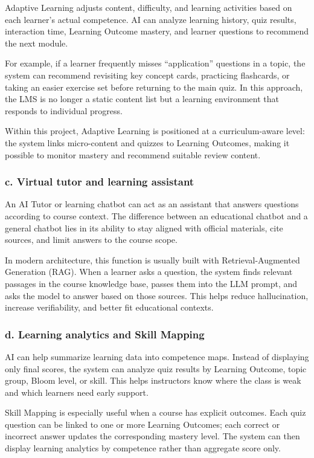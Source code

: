 Adaptive Learning adjusts content, difficulty, and learning activities based on
each learner's actual competence. AI can analyze learning history, quiz
results, interaction time, Learning Outcome mastery, and learner questions to
recommend the next module.

For example, if a learner frequently misses ``application'' questions in a
topic, the system can recommend revisiting key concept cards, practicing
flashcards, or taking an easier exercise set before returning to the main
quiz. In this approach, the LMS is no longer a static content list but a
learning environment that responds to individual progress.

Within this project, Adaptive Learning is positioned at a curriculum-aware
level: the system links micro-content and quizzes to Learning Outcomes, making
it possible to monitor mastery and recommend suitable review content.

\subsubsection*{c. Virtual tutor and learning assistant}

An AI Tutor or learning chatbot can act as an assistant that answers questions
according to course context. The difference between an educational chatbot and
a general chatbot lies in its ability to stay aligned with official materials,
cite sources, and limit answers to the course scope.

In modern architecture, this function is usually built with
Retrieval-Augmented Generation (RAG). When a learner asks a question, the
system finds relevant passages in the course knowledge base, passes them into
the LLM prompt, and asks the model to answer based on those sources. This helps
reduce hallucination, increase verifiability, and better fit educational
contexts.

\subsubsection*{d. Learning analytics and Skill Mapping}

AI can help summarize learning data into competence maps. Instead of displaying
only final scores, the system can analyze quiz results by Learning Outcome,
topic group, Bloom level, or skill. This helps instructors know where the class
is weak and which learners need early support.

Skill Mapping is especially useful when a course has explicit outcomes. Each
quiz question can be linked to one or more Learning Outcomes; each correct or
incorrect answer updates the corresponding mastery level. The system can then
display learning analytics by competence rather than aggregate score only.

